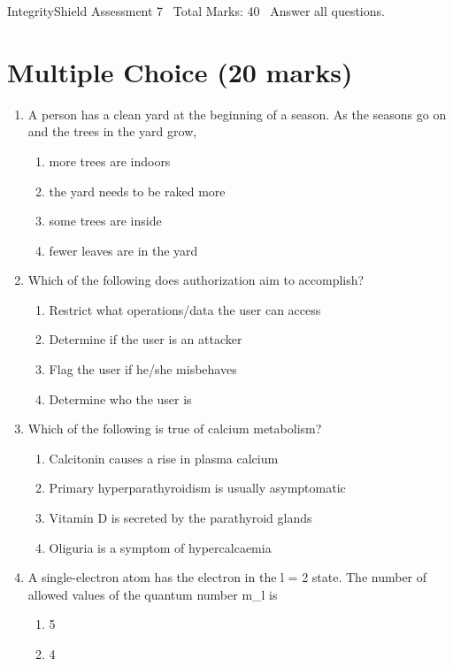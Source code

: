 \documentclass[12pt]{article}
\begin{document}
\begin{center}
IntegrityShield Assessment 7 \
Total Marks: 40 \
Answer all questions.
\end{center}

\section*{Multiple Choice (20 marks)}
\begin{enumerate}[label=\arabic*.]
\item A person has a clean yard at the beginning of a season. As the seasons go on and the trees in the yard grow,
\begin{enumerate}[label=(\alph*)]
    \item more trees are indoors
    \item the yard needs to be raked more
    \item some trees are inside
    \item fewer leaves are in the yard
\end{enumerate}
\item Which of the following does authorization aim to accomplish?
\begin{enumerate}[label=(\alph*)]
    \item Restrict what operations/data the user can access
    \item Determine if the user is an attacker
    \item Flag the user if he/she misbehaves
    \item Determine who the user is
\end{enumerate}
\item Which of the following is true of calcium metabolism?
\begin{enumerate}[label=(\alph*)]
    \item Calcitonin causes a rise in plasma calcium
    \item Primary hyperparathyroidism is usually asymptomatic
    \item Vitamin D is secreted by the parathyroid glands
    \item Oliguria is a symptom of hypercalcaemia
\end{enumerate}
\item A single-electron atom has the electron in the l = 2 state. The number of allowed values of the quantum number m\_l is
\begin{enumerate}[label=(\alph*)]
    \item 5
    \item 4

\end{enumerate}
\end{enumerate}
\end{document}
